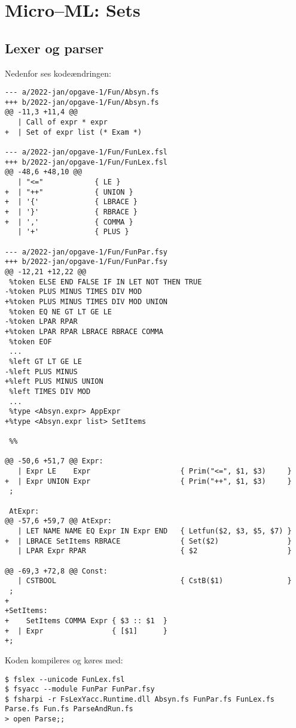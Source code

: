 \section{Micro–ML: Sets}

\subsection{Lexer og parser}

Nedenfor ses kodeændringen:

\begin{verbatim}
--- a/2022-jan/opgave-1/Fun/Absyn.fs
+++ b/2022-jan/opgave-1/Fun/Absyn.fs
@@ -11,3 +11,4 @@
   | Call of expr * expr
+  | Set of expr list (* Exam *)

--- a/2022-jan/opgave-1/Fun/FunLex.fsl
+++ b/2022-jan/opgave-1/Fun/FunLex.fsl
@@ -48,6 +48,10 @@
   | "<="            { LE }
+  | "++"            { UNION }
+  | '{'             { LBRACE }
+  | '}'             { RBRACE }
+  | ','             { COMMA }
   | '+'             { PLUS }    

--- a/2022-jan/opgave-1/Fun/FunPar.fsy
+++ b/2022-jan/opgave-1/Fun/FunPar.fsy
@@ -12,21 +12,22 @@
 %token ELSE END FALSE IF IN LET NOT THEN TRUE
-%token PLUS MINUS TIMES DIV MOD
+%token PLUS MINUS TIMES DIV MOD UNION
 %token EQ NE GT LT GE LE
-%token LPAR RPAR 
+%token LPAR RPAR LBRACE RBRACE COMMA
 %token EOF
 ...
 %left GT LT GE LE
-%left PLUS MINUS
+%left PLUS MINUS UNION
 %left TIMES DIV MOD 
 ...
 %type <Absyn.expr> AppExpr
+%type <Absyn.expr list> SetItems
 
 %%
 
@@ -50,6 +51,7 @@ Expr:
   | Expr LE    Expr                     { Prim("<=", $1, $3)     }
+  | Expr UNION Expr                     { Prim("++", $1, $3)     }
 ;
 
 AtExpr:
@@ -57,6 +59,7 @@ AtExpr:
   | LET NAME NAME EQ Expr IN Expr END   { Letfun($2, $3, $5, $7) }
+  | LBRACE SetItems RBRACE              { Set($2)                }
   | LPAR Expr RPAR                      { $2                     }
 
@@ -69,3 +72,8 @@ Const:
   | CSTBOOL                             { CstB($1)               }
 ;
+
+SetItems:
+    SetItems COMMA Expr { $3 :: $1  }
+  | Expr                { [$1]      }
+;
\end{verbatim}

Koden kompileres og køres med:

\begin{verbatim}
$ fslex --unicode FunLex.fsl
$ fsyacc --module FunPar FunPar.fsy
$ fsharpi -r FsLexYacc.Runtime.dll Absyn.fs FunPar.fs FunLex.fs Parse.fs Fun.fs ParseAndRun.fs
> open Parse;;
\end{verbatim}

